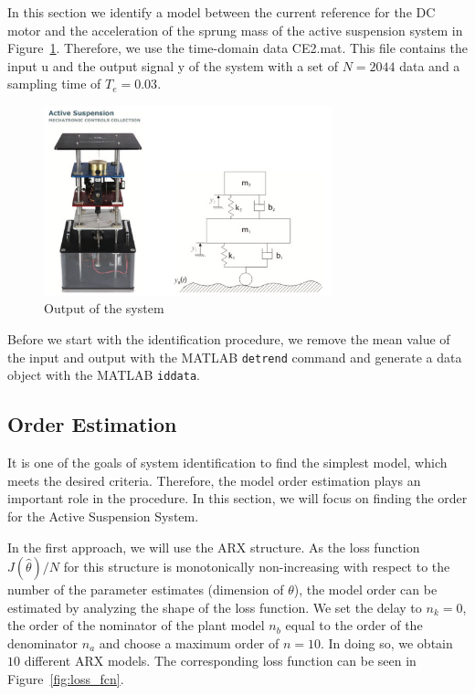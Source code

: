 \documentclass{scrartcl}
\begin{document}
In this section we identify a model between the current reference for the DC motor and the acceleration of the sprung mass of the active suspension system in Figure~\ref{fig:active_suspension}. 
Therefore, we use the time-domain data CE2.mat. This file contains the input u and the output signal y of the system with a set of $N = 2044$ data and a sampling time of $T_e = 0.03$. \\

\begin{figure}[h]
	\centering
	\includegraphics[height=5.5cm]{figures/active_suspension.png}
	\caption{Output of the system}\label{fig:active_suspension}
\end{figure}


Before we start with the identification procedure, we remove the mean value of the input and output with the MATLAB \texttt{detrend} command and generate a data object with the MATLAB \texttt{iddata}.

\subsection{Order Estimation}

It is one of the goals of system identification to find the simplest model, which meets the desired criteria. Therefore, the model order estimation plays an important role in the procedure. In this section, we will focus on finding the order for the Active Suspension System. 

In the first approach, we will use the ARX structure. As the loss function $ J(\hat{\theta}) /N $ for this structure is monotonically non-increasing with respect to the number of the parameter estimates (dimension of $\theta$), the model order can be estimated by analyzing the shape of the loss function. We set the delay to $n_k = 0$, the order of the nominator of the plant model $n_b$ equal to the order of the denominator $n_a$ and choose a maximum order of $n=10$. In doing so, we obtain $10$ different ARX models. The corresponding loss function can be seen in Figure~\ref{fig:loss_fcn}. 
\end{document}
